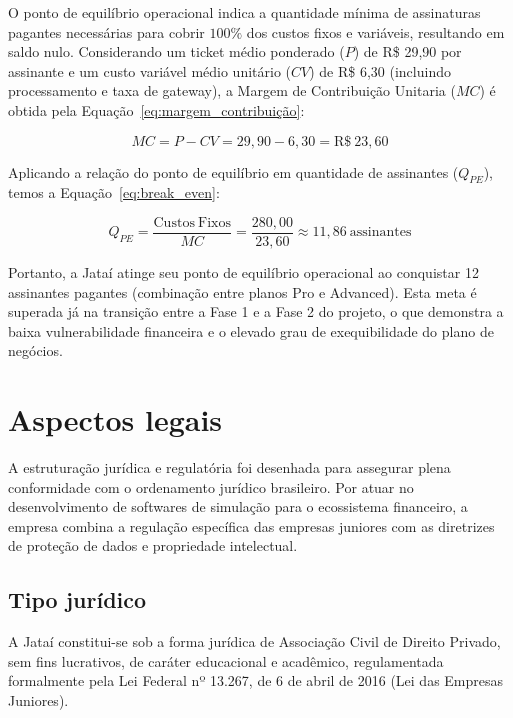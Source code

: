 \documentclass[
  12pt,
  openright,
  oneside,
  a4paper,
  brazilian
]{abntex2}
\begin{document}
O ponto de equilíbrio operacional indica a quantidade mínima de assinaturas pagantes necessárias para cobrir $100\%$ dos custos fixos e variáveis, resultando em saldo nulo. Considerando um ticket médio ponderado ($P$) de R\$ 29,90 por assinante e um custo variável médio unitário ($CV$) de R\$ 6,30 (incluindo processamento e taxa de gateway), a Margem de Contribuição Unitaria ($MC$) é obtida pela Equação~\ref{eq:margem_contribuição}:

\begin{equation}
\label{eq:margem_contribuição}
MC = P - CV = 29,90 - 6,30 = \mathrm{R\$}\ 23,60
\end{equation}

Aplicando a relação do ponto de equilíbrio em quantidade de assinantes ($Q_{PE}$), temos a Equação~\ref{eq:break_even}:

\begin{equation}
\label{eq:break_even}
Q_{PE} = \frac{\mathrm{Custos\ Fixos}}{MC} = \frac{280,00}{23,60} \approx 11,86\ \mathrm{assinantes}
\end{equation}

Portanto, a Jataí atinge seu ponto de equilíbrio operacional ao conquistar 12 assinantes pagantes (combinação entre planos Pro e Advanced). Esta meta é superada já na transição entre a Fase 1 e a Fase 2 do projeto, o que demonstra a baixa vulnerabilidade financeira e o elevado grau de exequibilidade do plano de negócios.

\chapter{Aspectos legais}
\label{cap:aspectos_legais}

A estruturação jurídica e regulatória foi desenhada para assegurar plena conformidade com o ordenamento jurídico brasileiro. Por atuar no desenvolvimento de softwares de simulação para o ecossistema financeiro, a empresa combina a regulação específica das empresas juniores com as diretrizes de proteção de dados e propriedade intelectual.

\section{Tipo jurídico}
\label{sec:tipo_juridico}

A Jataí constitui-se sob a forma jurídica de Associação Civil de Direito Privado, sem fins lucrativos, de caráter educacional e acadêmico, regulamentada formalmente pela Lei Federal nº 13.267, de 6 de abril de 2016 (Lei das Empresas Juniores).
\end{document}
